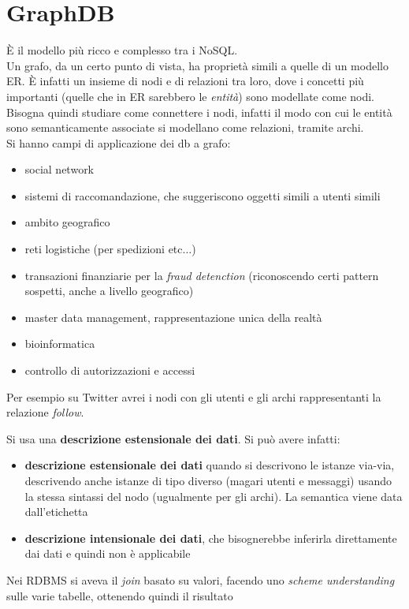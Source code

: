 \documentclass[a4paper,12pt, oneside]{book}
\begin{document}
\section{GraphDB}
È il modello più ricco e complesso tra i NoSQL.\\
Un grafo, da un certo punto di vista, ha proprietà simili a quelle di un modello
ER. È infatti un insieme di nodi e di relazioni tra loro, dove i concetti più
importanti (quelle che in ER sarebbero le \textit{entità}) sono modellate come
nodi. Bisogna quindi studiare come connettere i nodi, infatti il modo con cui
le entità sono semanticamente associate si modellano come relazioni, tramite
archi.\\
Si hanno campi di applicazione dei db a grafo:
\begin{itemize}
  \item social network
  \item sistemi di raccomandazione, che suggeriscono oggetti simili a utenti
  simili
  \item ambito geografico
  \item reti logistiche (per spedizioni etc$\ldots$)
  \item transazioni finanziarie per la \textit{fraud detenction} (riconoscendo
  certi pattern sospetti, anche a livello geografico)
  \item master data management, rappresentazione unica della realtà
  \item bioinformatica
  \item controllo di autorizzazioni e accessi
\end{itemize}
\begin{esempio}
  Per esempio su Twitter avrei i nodi con gli utenti e gli archi rappresentanti
  la relazione \textit{follow}.
\end{esempio}
Si usa una \textbf{descrizione estensionale dei dati}. Si può avere infatti:
\begin{itemize}
  \item \textbf{descrizione estensionale dei dati} quando si descrivono le
  istanze via-via, descrivendo anche istanze di tipo diverso (magari utenti e
  messaggi) usando la stessa sintassi del nodo (ugualmente per gli archi). La
  semantica viene data dall'etichetta
  \item \textbf{descrizione intensionale dei dati}, che bisognerebbe inferirla
  direttamente dai dati e quindi non è applicabile
\end{itemize}
Nei RDBMS si aveva il \textit{join} basato su valori, facendo uno
\textit{scheme understanding} sulle varie tabelle, ottenendo quindi il risultato
\end{document}
